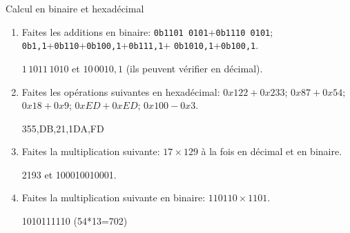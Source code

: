 \begin{exercice}
  \begin{exercicelet}{Calcul en binaire et hexadécimal}
    \begin{enumerate}
    \item Faites les additions en binaire:
      \texttt{0b1101\,0101}+\texttt{0b1110\,0101};
      \texttt{0b1,1}+\texttt{0b110}+\texttt{0b100,1}+\texttt{0b111,1}+%
      \texttt{0b1010,1}+\texttt{0b100,1}.
      \begin{xcorrection}$1\,1011\,1010$ et $10\,0010,1$ (ils peuvent
        vérifier en décimal).\end{xcorrection}
    \item Faites les opérations suivantes en hexadécimal: $0x122+0x233$;
      $0x87+0x54$; $0x18+0x9$; $0xED+0xED$; $0x100-0x3$.
      \begin{xcorrection}355,DB,21,1DA,FD\end{xcorrection}
    \item Faites la multiplication suivante: $17\times129$ à la fois en
      décimal et en binaire.
      \begin{xcorrection}2193 et 100010010001.\end{xcorrection}
    \item Faites la multiplication suivante en binaire: $110110\times 1101$.
      \begin{xcorrection}1010111110 (54*13=702)\end{xcorrection}
    \end{enumerate}
  \end{exercicelet}
\end{exercice}
